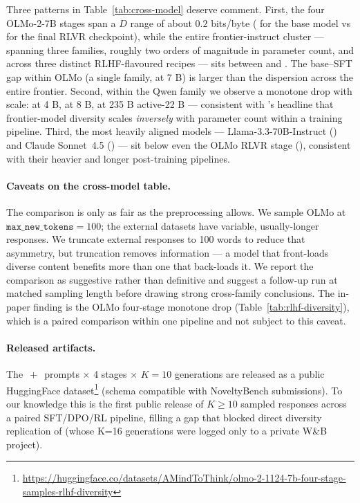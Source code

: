 Three patterns in Table~\ref{tab:cross-model} deserve comment. First, the four OLMo-2-7B stages span a $D$ range of about $0.2$ bits/byte (\crossModelOlmoBase{} for the base model vs \crossModelOlmoInstruct{} for the final RLVR checkpoint), while the entire frontier-instruct cluster --- spanning three families, roughly two orders of magnitude in parameter count, and across three distinct RLHF-flavoured recipes --- sits between \crossModelLlamaThreeThreeSeventyB{} and \crossModelGptFive{}. The base--SFT gap within OLMo (a single family, at 7 B) is larger than the dispersion across the entire frontier. Second, within the Qwen family we observe a monotone drop with scale: \crossModelQwenFourB{} at 4 B, \crossModelQwenEightB{} at 8 B, \crossModelQwenTwoThreeFiveB{} at 235 B active-22 B --- consistent with \citet{zhang2025noveltybench}'s headline that frontier-model diversity scales \emph{inversely} with parameter count within a training pipeline. Third, the most heavily aligned models --- Llama-3.3-70B-Instruct (\crossModelLlamaThreeThreeSeventyB{}) and Claude Sonnet~4.5 (\crossModelClaudeSonnetFourFive{}) --- sit below even the OLMo RLVR stage (\crossModelOlmoInstruct{}), consistent with their heavier and longer post-training pipelines.

\paragraph{Caveats on the cross-model table.} The comparison is only as fair as the preprocessing allows. We sample OLMo at $\texttt{max\_new\_tokens}{=}100$; the external datasets have variable, usually-longer responses. We truncate external responses to 100 words to reduce that asymmetry, but truncation removes information --- a model that front-loads diverse content benefits more than one that back-loads it. We report the comparison as suggestive rather than definitive and suggest a follow-up run at matched sampling length before drawing strong cross-family conclusions. The in-paper finding is the OLMo four-stage monotone drop (Table~\ref{tab:rlhf-diversity}), which is a paired comparison within one pipeline and not subject to this caveat.

\paragraph{Released artifacts.} The \olmoAlpacaN$\,+\,$\olmoNbCuratedN{} prompts $\times$ 4 stages $\times$ $K{=}10$ generations are released as a public HuggingFace dataset\footnote{\url{https://huggingface.co/datasets/AMindToThink/olmo-2-1124-7b-four-stage-samples-rlhf-diversity}} (schema compatible with NoveltyBench submissions). To our knowledge this is the first public release of $K\!\ge\!10$ sampled responses across a paired SFT/DPO/RL pipeline, filling a gap that blocked direct diversity replication of \citet{kirk2023rlhf} (whose K=16 generations were logged only to a private W\&B project).

